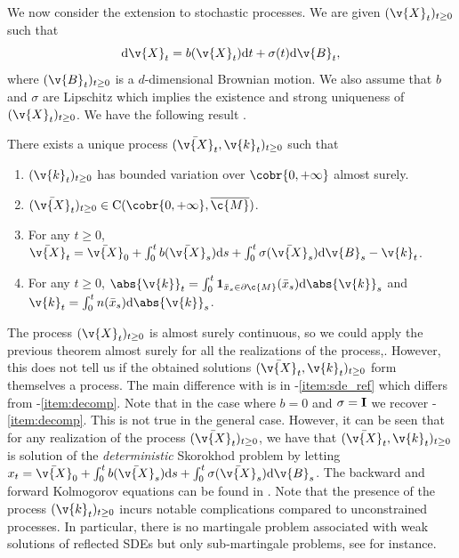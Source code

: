 We now consider the extension to stochastic processes.
We are given \((\v{X}_t)_{t \geq 0}\) such that \begin{equation} \label{eq:sde} \mathrm{d} \v{X}_t = b(\v{X}_t) \mathrm{d} t + \sigma(t) \mathrm{d} \v{B}_t , \end{equation} where \((\v{B}_t)_{t \geq 0}\) is a \(d\)-dimensional Brownian motion.
We also assume that \(b\) and \(\sigma\) are Lipschitz which implies the existence and strong uniqueness of \((\v{X}_t)_{t \geq 0}\).
We have the following result \cite{lions1984stochastic}.

\begin{theorem}
	\label{thm:existence_reflected_sto}
	There exists a unique process \((\bar{\v{X}}_t, \v{k}_t)_{t \geq 0}\) such that \begin{enumerate}[label=(\alph*)] \item \((\v{k}_t)_{t \geq 0}\) has bounded variation over \(\cobr{0,+\infty}\) almost surely.
		\item \((\bar{\v{X}}_t)_{t \geq 0} \in \mathrm{C}(\cobr{0,+\infty}, \cl{\c{M}})\).
		\item For any \(t \geq 0\), \(\bar{\v{X}}_t = \bar{\v{X}}_0 + \int_0^t b(\bar{\v{X}}_s) \mathrm{d} s + \int_0^t \sigma(\bar{\v{X}}_s) \mathrm{d} \v{B}_s - \v{k}_t\). \label{item:sde_ref}
		\item For any \(t \geq 0\),
		      \(\abs{\v{k}}_t = \int_0^t \mathbf{1}_{\bar{x}_s \in \partial \c{M}}(\bar{x}_s) \mathrm{d} \abs{\v{k}}_s\) and
		      \(\v{k}_t = \int_0^t n(\bar{x}_s) \mathrm{d} \abs{\v{k}}_s\).
	\end{enumerate}
\end{theorem}

The process \((\v{X}_t)_{t \geq 0}\) is almost surely continuous, so we could apply the previous theorem almost surely for all the realizations of the process,.
However, this does not tell us if the obtained solutions \((\bar{\v{X}}_t, \v{k}_t)_{t \geq 0}\) form themselves a process.
The main difference with  is in -\ref{item:sde_ref} which differs from -\ref{item:decomp}.
Note that in the case where \(b=0\) and \(\sigma =\m{I}\) we recover -\ref{item:decomp}.
This is not true in the general case.
However, it can be seen that for any realization of the process \((\bar{\v{X}}_t)_{t \geq 0}\), we have that \((\bar{\v{X}}_t, \v{k}_t)_{t \geq 0}\) is solution of the \emph{deterministic} Skorokhod problem by letting \(x_t = \bar{\v{X}}_0 + \int_0^t b(\bar{\v{X}}_s) \mathrm{d} s + \int_0^t \sigma(\bar{\v{X}}_s) \mathrm{d} \v{B}_s\).
The backward and forward Kolmogorov equations can be found in \cite{burdzy2004heat}.
Note that the presence of the process \((\v{k}_t)_{t \geq 0}\) incurs notable complications compared to unconstrained processes.
In particular, there is no martingale problem associated with weak solutions of reflected SDEs but only sub-martingale problems, see \cite{kang2017submartingale} for instance.

